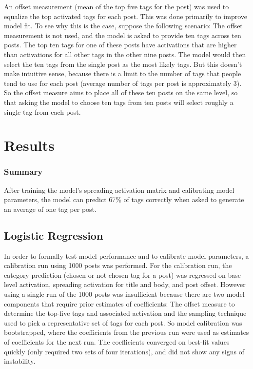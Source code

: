 \documentclass[10pt,letterpaper]{article}
\begin{document}
An offset measurement (mean of the top five tags for the post) was used to equalize the top activated tags for each post.
This was done primarily to improve model fit.
To see why this is the case, suppose the following scenario:
The offset measurement is not used, and the model is asked to provide ten tags across ten posts.
The top ten tags for one of these posts have activations that are higher than activations for all other tags in the other nine posts.
The model would then select the ten tags from the single post as the most likely tags.
But this doesn't make intuitive sense, because there is a limit to the number of tags that people tend to use for each post (average number of tags per post is approximately 3).
So the offset measure aims to place all of these ten posts on the same level, so that asking the model to choose ten tags from ten posts will select roughly a single tag from each post.

\section{Results}

\subsubsection{Summary}

After training the model's spreading activation matrix and calibrating model parameters, the model can predict 67\% of tags correctly when asked to generate an average of one tag per post.

\subsection{Logistic Regression}

In order to formally test model performance and to calibrate model parameters, a calibration run using \num{1000} posts was performed.
For the calibration run, the category prediction (chosen or not chosen tag for a post) was regressed on base-level activation, spreading activation for title and body, and post offset.
However using a single run of the \num{1000} posts was insufficient because there are two model components that require prior estimates of coefficients:
The offset measure to determine the top-five tags and associated activation and the sampling technique used to pick a representative set of tags for each post.
So model calibration was bootstrapped, where the coefficients from the previous run were used as estimates of coefficients for the next run.
The coefficients converged on best-fit values quickly (only required two sets of four iterations), and did not show any signs of instability.
\end{document}
